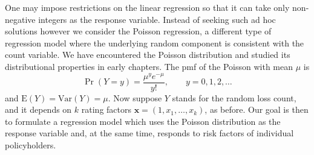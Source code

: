 \documentclass[12pt]{article}
\def\E{\mathrm{E}}
\def\Var{\mathrm{Var}}
\begin{document}
One may impose restrictions on the linear regression so that it can take only non-negative integers as the response variable. Instead of seeking such ad hoc solutions however we consider the Poisson regression, a different type of regression model where the underlying random component is consistent with the count variable. We have encountered the Poisson distribution and studied its distributional properties  in early chapters. The pmf of the Poisson with mean $\mu$ is
\begin{equation}
\label{Pois.pmf}
\Pr(Y=y)=\frac{\mu^y e^{-\mu}}{y!},\qquad y=0,1,2, \ldots
\end{equation} and $\E(Y)=\Var(Y)=\mu$. 
Now suppose $Y$ stands for the random loss count, and it depends on $k$ rating factors $\mathbf{ x}=(1, x_1, \ldots, x_k)$, as before. Our goal is then to formulate a regression model which uses the Poisson distribution as the response variable and, at the same time, responds to risk factors of individual policyholders.  
%
%
%
%
%
\end{document}
